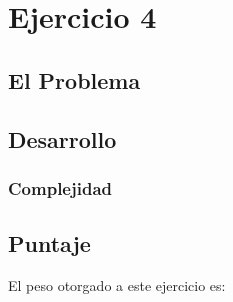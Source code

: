 \section{Ejercicio 4}
\subsection{El Problema}

\subsection{Desarrollo}

\subsubsection{Complejidad}

\subsection{Puntaje}
El peso otorgado a este ejercicio es:
